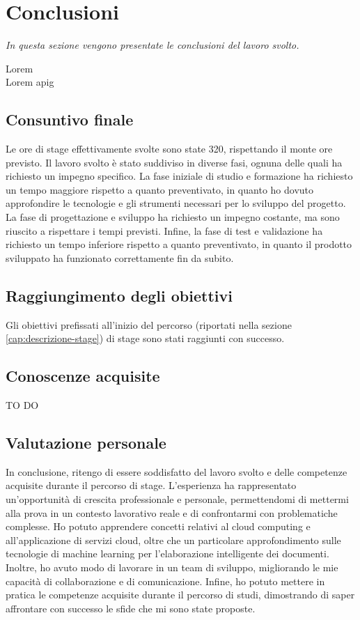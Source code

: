 \chapter{Conclusioni}
\label{cap:conclusioni}
\emph{In questa sezione vengono presentate le conclusioni del lavoro svolto.}

Lorem 
\\
Lorem \gls{apig}

\section{Consuntivo finale}

Le ore di stage effettivamente svolte sono state 320, rispettando il monte ore previsto. Il lavoro svolto è stato suddiviso in diverse fasi, ognuna delle quali ha richiesto un impegno specifico. La fase iniziale di studio e formazione ha richiesto un tempo maggiore rispetto a quanto preventivato, in quanto ho dovuto approfondire le tecnologie e gli strumenti necessari per lo sviluppo del progetto. La fase di progettazione e sviluppo ha richiesto un impegno costante, ma sono riuscito a rispettare i tempi previsti. Infine, la fase di test e validazione ha richiesto un tempo inferiore rispetto a quanto preventivato, in quanto il prodotto sviluppato ha funzionato correttamente fin da subito.

\section{Raggiungimento degli obiettivi}
Gli obiettivi prefissati all'inizio del percorso (riportati nella sezione \ref{cap:descrizione-stage}) di stage sono stati raggiunti con successo. 


\section{Conoscenze acquisite}
TO DO

\section{Valutazione personale}
In conclusione, ritengo di essere soddisfatto del lavoro svolto e delle competenze acquisite durante il percorso di stage. L'esperienza ha rappresentato un'opportunità di crescita professionale e personale, permettendomi di mettermi alla prova in un contesto lavorativo reale e di confrontarmi con problematiche complesse. Ho potuto apprendere concetti relativi al cloud computing e all'applicazione di servizi cloud, oltre che un particolare approfondimento sulle tecnologie di machine learning per l'elaborazione intelligente dei documenti. Inoltre, ho avuto modo di lavorare in un team di sviluppo, migliorando le mie capacità di collaborazione e di comunicazione. Infine, ho potuto mettere in pratica le competenze acquisite durante il percorso di studi, dimostrando di saper affrontare con successo le sfide che mi sono state proposte.
